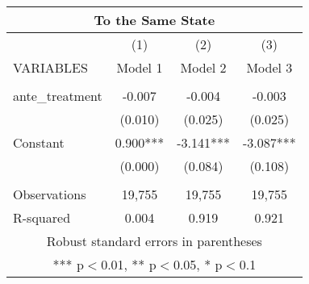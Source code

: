 \begin{tabular}{lccc}
\multicolumn{4}{c}{To the Same State} \\ \hline
 & (1) & (2) & (3) \\
VARIABLES & Model 1 & Model 2 & Model 3 \\ \hline
 &  &  &  \\
ante\_treatment & -0.007 & -0.004 & -0.003 \\
 & (0.010) & (0.025) & (0.025) \\
Constant & 0.900*** & -3.141*** & -3.087*** \\
 & (0.000) & (0.084) & (0.108) \\
 &  &  &  \\
Observations & 19,755 & 19,755 & 19,755 \\
 R-squared & 0.004 & 0.919 & 0.921 \\ \hline
\multicolumn{4}{c}{ Robust standard errors in parentheses} \\
\multicolumn{4}{c}{ *** p$<$0.01, ** p$<$0.05, * p$<$0.1} \\
\end{tabular}
